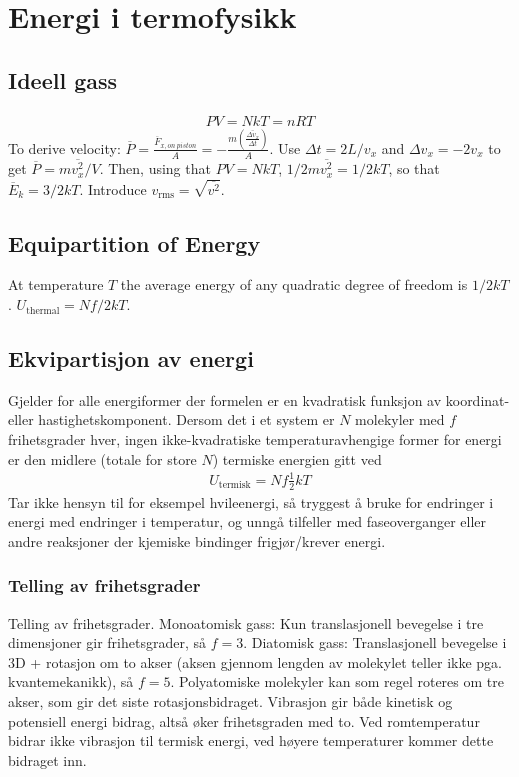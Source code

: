 \documentclass[12pt]{article}
\begin{document}
\section{Energi i termofysikk}
\subsection{Ideell gass}
\begin{align*}
  PV = NkT = nRT
\end{align*}
To derive velocity:
$
\overline{P}=\frac{\overline{F}_{x,on\ piston}}{A}=-\frac{m\left(\overline{\frac{\Delta v_x}{\Delta t}}\right)}{A}
$.
Use $\Delta t = 2L/v_x$ and $\Delta v_x=-2v_x$ to get $\overline{P}=m\overline{v_x^2}/V$. Then, using that $PV=NkT$, $1/2 m\overline{v_x^2} = 1/2kT$, so that $\overline{E}_k=3/2 kT$. Introduce $v_{\mathrm{rms}}=\sqrt{\overline{v^2}}$.
\subsection{Equipartition of Energy}
At temperature $T$ the average energy of any quadratic degree of freedom is $1/2 kT$. $U_{\mathrm{thermal}}=Nf/2 kT$.
\subsection{Ekvipartisjon av energi}
Gjelder for alle energiformer der formelen er en kvadratisk funksjon av koordinat-
eller hastighetskomponent. Dersom det i et system er $N$ molekyler med $f$
frihetsgrader hver, ingen ikke-kvadratiske temperaturavhengige former for energi
er den midlere (totale for store $N$) termiske energien gitt ved
\begin{align*}
  U_\text{termisk} = N f \frac{1}{2}kT
\end{align*}
Tar ikke hensyn til for eksempel hvileenergi, så tryggest å bruke for endringer
i energi med endringer i temperatur, og unngå tilfeller med faseoverganger
eller andre reaksjoner der kjemiske bindinger frigjør/krever energi.

\subsubsection{Telling av frihetsgrader}
Telling av frihetsgrader. Monoatomisk gass: Kun translasjonell bevegelse i tre
dimensjoner gir frihetsgrader, så $f = 3$. Diatomisk gass: Translasjonell
bevegelse i 3D + rotasjon om to akser (aksen gjennom lengden av molekylet
teller ikke pga. kvantemekanikk), så $f = 5$. Polyatomiske molekyler kan som
regel roteres om tre akser, som gir det siste rotasjonsbidraget. Vibrasjon
gir både kinetisk og potensiell energi bidrag, altså øker frihetsgraden med to.
Ved romtemperatur bidrar ikke vibrasjon til termisk energi, ved høyere temperaturer
kommer dette bidraget inn.
\end{document}
